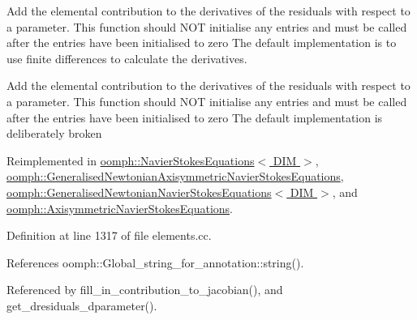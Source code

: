 Add the elemental contribution to the derivatives of the residuals with respect to a parameter. This function should N\+OT initialise any entries and must be called after the entries have been initialised to zero The default implementation is to use finite differences to calculate the derivatives. 

Add the elemental contribution to the derivatives of the residuals with respect to a parameter. This function should N\+OT initialise any entries and must be called after the entries have been initialised to zero The default implementation is deliberately broken 

Reimplemented in \hyperlink{classoomph_1_1NavierStokesEquations_a2a7ca03e4f74fabe48dcd9da0fa6d185}{oomph\+::\+Navier\+Stokes\+Equations$<$ D\+I\+M $>$}, \hyperlink{classoomph_1_1GeneralisedNewtonianAxisymmetricNavierStokesEquations_a863e502006b214a160e50868b803ffa9}{oomph\+::\+Generalised\+Newtonian\+Axisymmetric\+Navier\+Stokes\+Equations}, \hyperlink{classoomph_1_1GeneralisedNewtonianNavierStokesEquations_a315b6dd9916836000c858a434d198851}{oomph\+::\+Generalised\+Newtonian\+Navier\+Stokes\+Equations$<$ D\+I\+M $>$}, and \hyperlink{classoomph_1_1AxisymmetricNavierStokesEquations_aa43f48866735deb28609372232b8cd2a}{oomph\+::\+Axisymmetric\+Navier\+Stokes\+Equations}.



Definition at line 1317 of file elements.\+cc.



References oomph\+::\+Global\+\_\+string\+\_\+for\+\_\+annotation\+::string().



Referenced by fill\+\_\+in\+\_\+contribution\+\_\+to\+\_\+jacobian(), and get\+\_\+dresiduals\+\_\+dparameter().

\mbox{\label{classoomph_1_1GeneralisedElement_a94e118d65f31ce404963509e462b2d0e}} 
